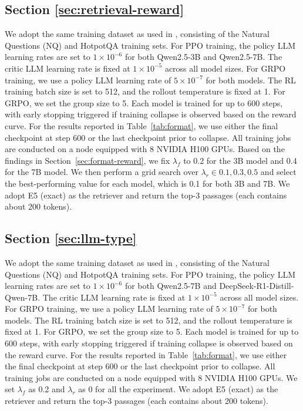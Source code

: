 \subsection{Section \ref{sec:retrieval-reward}}\label{apx:setting2}

We adopt the same training dataset as used in \cite{jin2025search}, consisting of the Natural Questions (NQ) and HotpotQA training sets.
For PPO training, the policy LLM learning rates are set to $1 \times 10^{-6}$ for both Qwen2.5-3B and Qwen2.5-7B. The critic LLM learning rate is fixed at $1 \times 10^{-5}$ across all model sizes.
For GRPO training, we use a policy LLM learning rate of $5 \times 10^{-7}$ for both models. The RL training batch size is set to 512, and the rollout temperature is fixed at 1. For GRPO, we set the group size to 5.
Each model is trained for up to 600 steps, with early stopping triggered if training collapse is observed based on the reward curve. For the results reported in Table~\ref{tab:format}, we use either the final checkpoint at step 600 or the last checkpoint prior to collapse.
All training jobs are conducted on a node equipped with 8 NVIDIA H100 GPUs.
Based on the findings in Section~\ref{sec:format-reward}, we fix $\lambda_f$ to 0.2 for the 3B model and 0.4 for the 7B model. 
We then perform a grid search over $\lambda_r \in {0.1, 0.3, 0.5}$ and select the best-performing value for each model, which is 0.1 for both 3B and 7B.
We adopt E5 (exact) as the retriever and return the top-3 passages (each contains about 200 tokens).

\subsection{Section \ref{sec:llm-type}}\label{apx:setting3}

We adopt the same training dataset as used in \cite{jin2025search}, consisting of the Natural Questions (NQ) and HotpotQA training sets.
For PPO training, the policy LLM learning rates are set to $1 \times 10^{-6}$ for both Qwen2.5-7B and DeepSeek-R1-Distill-Qwen-7B. The critic LLM learning rate is fixed at $1 \times 10^{-5}$ across all model sizes.
For GRPO training, we use a policy LLM learning rate of $5 \times 10^{-7}$ for both models. The RL training batch size is set to 512, and the rollout temperature is fixed at 1. For GRPO, we set the group size to 5.
Each model is trained for up to 600 steps, with early stopping triggered if training collapse is observed based on the reward curve. For the results reported in Table~\ref{tab:format}, we use either the final checkpoint at step 600 or the last checkpoint prior to collapse.
All training jobs are conducted on a node equipped with 8 NVIDIA H100 GPUs.
We set $\lambda_f$ as 0.2 and $\lambda_r$ as 0 for all the experiment.
We adopt E5 (exact) as the retriever and return the top-3 passages (each contains about 200 tokens).


